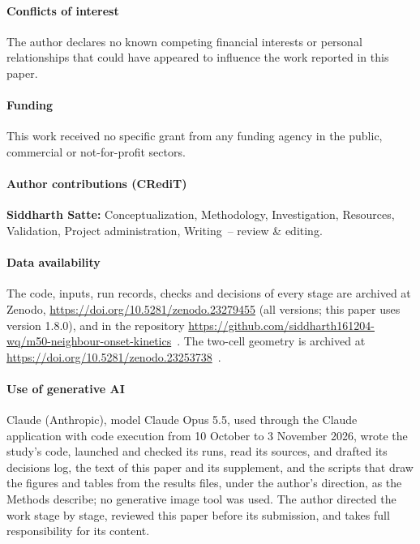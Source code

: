 \documentclass[preprint,12pt]{elsarticle}
\begin{document}
\paragraph{Conflicts of interest} The author declares no known competing financial interests or personal relationships that could have appeared to influence the work reported in this paper.

\paragraph{Funding} This work received no specific grant from any funding agency in the public, commercial or not-for-profit sectors.

\paragraph{Author contributions (CRediT)} \textbf{Siddharth Satte:} Conceptualization, Methodology, Investigation, Resources, Validation, Project administration, Writing~-- review \& editing.

\paragraph{Data availability} The code, inputs, run records, checks and decisions of every stage are archived at Zenodo, \url{https://doi.org/10.5281/zenodo.23279455} (all versions; this paper uses version 1.8.0), and in the repository \url{https://github.com/siddharth161204-wq/m50-neighbour-onset-kinetics}~\cite{satte2026repo}. The two-cell geometry is archived at \url{https://doi.org/10.5281/zenodo.23253738}~\cite{satte2026twocell}.

\paragraph{Use of generative AI} Claude (Anthropic), model Claude Opus 5.5, used through the Claude application with code execution from 10 October to 3 November 2026, wrote the study's code, launched and checked its runs, read its sources, and drafted its decisions log, the text of this paper and its supplement, and the scripts that draw the figures and tables from the results files, under the author's direction, as the Methods describe; no generative image tool was used. The author directed the work stage by stage, reviewed this paper before its submission, and takes full responsibility for its content.




\end{document}
